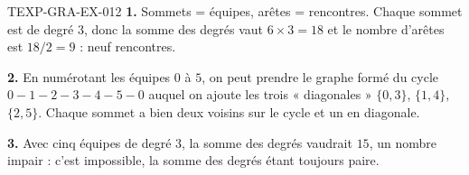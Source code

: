 \begin{corrige}{TEXP-GRA-EX-012}
\textbf{1.} Sommets = équipes, arêtes = rencontres. Chaque sommet est de degré
$3$, donc la somme des degrés vaut $6\times3=18$ et le nombre d'arêtes est
$18/2=9$ : neuf rencontres.

\textbf{2.} En numérotant les équipes $0$ à $5$, on peut prendre le graphe
formé du cycle $0-1-2-3-4-5-0$ auquel on ajoute les trois « diagonales »
$\{0,3\}$, $\{1,4\}$, $\{2,5\}$. Chaque sommet a bien deux voisins sur le
cycle et un en diagonale.

\textbf{3.} Avec cinq équipes de degré $3$, la somme des degrés vaudrait
$15$, un nombre impair : c'est impossible, la somme des degrés étant toujours
paire.
\end{corrige}

